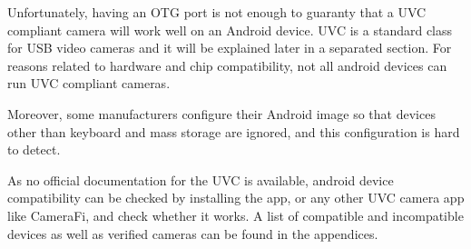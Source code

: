 Unfortunately, having an OTG port is not enough to guaranty that a UVC compliant camera will work well on an Android device. UVC is a standard class for USB video cameras and it will be explained later in a separated section. For reasons related to hardware and chip compatibility, not all android devices can run UVC compliant cameras. 

Moreover, some manufacturers configure their Android image so that devices other than keyboard and mass storage are ignored, and this configuration is hard to detect. 

As no official documentation for the UVC is available, android device compatibility can be checked by installing the app, or any other UVC camera app like CameraFi, and check whether it works. 
A list of compatible and incompatible devices as well as verified cameras can be found in the appendices.


